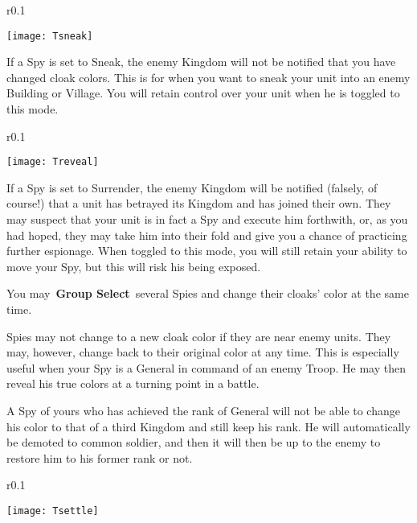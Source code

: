 \clearpage

\begin{wrapfigure}{r}{0.1\textwidth}
	\vspace{-20pt}
	\begin{center}
		\texttt{[image: Tsneak]}
	\end{center}
	\vspace{-10pt}
\end{wrapfigure}

If a Spy is set to Sneak, the enemy Kingdom will not be notified that you have changed cloak colors. This is for when you want to sneak your unit into an enemy Building or Village. You will retain control over your unit when he is toggled to this mode.

\begin{wrapfigure}{r}{0.1\textwidth}
	\vspace{-20pt}
	\begin{center}
		\texttt{[image: Treveal]}
	\end{center}
	\vspace{-20pt}
\end{wrapfigure}

If a Spy is set to Surrender, the enemy Kingdom will be notified (falsely, of course!) that a unit has betrayed its Kingdom and has joined their own. They may suspect that your unit is in fact a Spy and execute him forthwith, or, as you had hoped, they may take him into their fold and give you a chance of practicing further espionage. When toggled to this mode, you will still retain your ability to move your Spy, but this will risk his being exposed.

You may \textbf{Group Select} several Spies and change their cloaks’ color at the same time.

Spies may not change to a new cloak color if they are near enemy units. They may, however, change back to their original color at any time. This is especially useful when your Spy is a General in command of an enemy Troop. He may then reveal his true colors at a turning point in a battle.

A Spy of yours who has achieved the rank of General will not be able to change his color to that of a third Kingdom and still keep his rank. He will automatically be demoted to common soldier, and then it will then be up to the enemy to restore him to his former rank or not.

\begin{wrapfigure}{r}{0.1\textwidth}
	\vspace{-20pt}
	\begin{center}
		\texttt{[image: Tsettle]}
	\end{center}
	\vspace{-20pt}
\end{wrapfigure}

